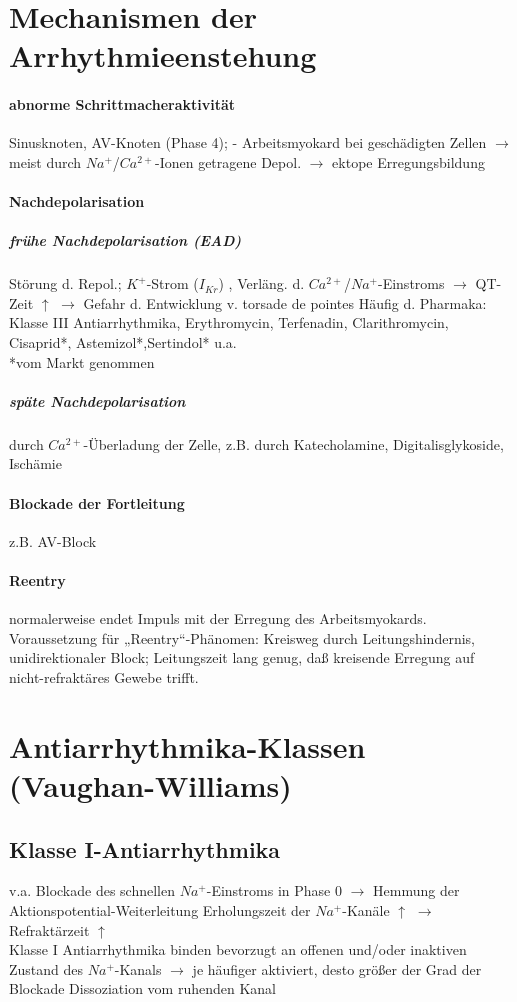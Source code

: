 \documentclass[10pt,a4paper]{report}
\begin{document}
\section{Mechanismen der Arrhythmieenstehung}
\paragraph{abnorme Schrittmacheraktivität} Sinusknoten, AV-Knoten (Phase 4); - Arbeitsmyokard bei geschädigten Zellen $\rightarrow$ meist durch $Na^+$/$Ca^{2+}$-Ionen getragene Depol. $\rightarrow$ ektope Erregungsbildung
\paragraph{Nachdepolarisation}
\subparagraph{frühe Nachdepolarisation (EAD)} Störung d. Repol.; $K^+$-Strom ($I_{Kr}$) , Verläng. d. $Ca^{2+}$/$Na^+$-Einstroms $\rightarrow$ QT-Zeit $\uparrow$ $\rightarrow$ Gefahr d. Entwicklung v. torsade de pointes Häufig d. Pharmaka: Klasse III Antiarrhythmika, Erythromycin,	Terfenadin, Clarithromycin, Cisaprid*, Astemizol*,Sertindol* u.a.\\
*vom Markt genommen
\subparagraph{späte Nachdepolarisation} durch $Ca^{2+}$-Überladung der Zelle, z.B. durch	Katecholamine, Digitalisglykoside, Ischämie
\paragraph{Blockade der Fortleitung}z.B. AV-Block
\paragraph{Reentry} normalerweise endet Impuls mit der Erregung des Arbeitsmyokards. Voraussetzung für „Reentry“-Phänomen: Kreisweg durch Leitungshindernis, unidirektionaler Block; Leitungszeit lang genug, daß kreisende Erregung auf nicht-refraktäres Gewebe trifft.
\section{Antiarrhythmika-Klassen (Vaughan-Williams)}
\subsection{Klasse I-Antiarrhythmika}
v.a. Blockade des schnellen $Na^+$-Einstroms in Phase 0 $\rightarrow$ Hemmung der Aktionspotential-Weiterleitung	Erholungszeit der $Na^+$-Kanäle $\uparrow$ $\rightarrow$ Refraktärzeit $\uparrow$ \\
Klasse I Antiarrhythmika binden bevorzugt an offenen und/oder inaktiven Zustand des $Na^+$-Kanals $\rightarrow$ je häufiger aktiviert, desto größer der Grad der Blockade Dissoziation vom ruhenden Kanal
\end{document}
